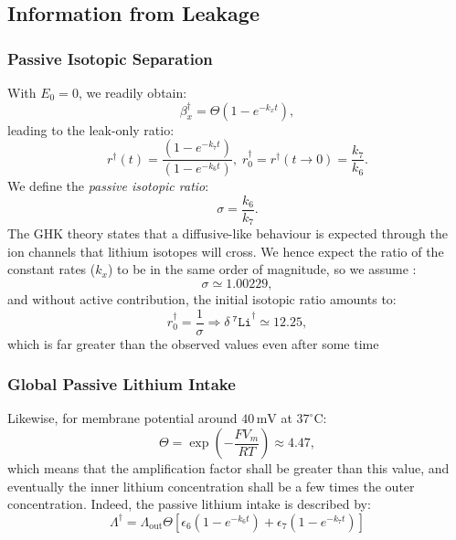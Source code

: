 \documentclass[aps,onecolumn,11pt]{revtex4}
\newcommand{\mychem}[1]{\mathtt{#1}}
\newcommand{\spLi}[1]{{~^{\mychem{#1}}\mychem{Li}}}
\newcommand{\deltaLi}{ {\delta\!\!\!\spLi{7}} }
\newcommand{\LiAll}{\Lambda}
\newcommand{\LiAllOut}{{\LiAll}_{\mathrm{out}}}
\newcommand{\todo}[1]{\framebox{\textbf{\color{WildStrawberry}{#1}}}}
\newcommand{\ko}{\dagger}
\begin{document}
\subsection{Information from Leakage}

\subsubsection{Passive Isotopic Separation}
With $E_0=0$, we readily obtain:
\begin{equation}
	\beta^\ko_x = \Theta \left(1-e^{-k_xt} \right),
\end{equation}
leading to the leak-only ratio:
\begin{equation}
	r^\ko(t) =  \dfrac{\left(1-e^{-k_7t} \right)}{\left(1-e^{-k_6t} \right)},\;r^\ko_0 = r^\ko(t\to0) = \dfrac{k_7}{k_6}.
\end{equation}
We define the \textit{passive isotopic ratio}:
\begin{equation}
\label{eq:sigma}
	\sigma  =  \dfrac{k_6}{k_7}.
\end{equation}
The GHK theory states that a diffusive-like behaviour is expected through the ion channels that lithium isotopes will cross.
We hence expect the ratio of the constant rates ($k_x$) to be in the same order of magnitude, so we assume \todo{ref}:
\begin{equation}
	\sigma \simeq 1.00229,
\end{equation}
and without active contribution, the initial isotopic ratio amounts to:
\begin{equation}
	r_0^\ko = \dfrac{1}{\sigma} \Rightarrow \deltaLi^\ko \simeq  12.25,
\end{equation}
which is far greater than the observed values even after some time \todo{ref figures in manuscript+values}


\subsubsection{Global Passive Lithium Intake}
Likewise, for membrane potential around $40\,\text{mV}$ at $37^\circ\text{C}$:
\begin{equation}
\label{eq:ThetaValue}
	\Theta = \exp\left( -\dfrac{FV_m}{RT}\right) \approx 4.47,
\end{equation}
which means that the amplification factor shall be greater than this value, and eventually the inner lithium concentration shall
be a few times the outer concentration. Indeed, the passive lithium intake is described by:
\begin{equation}
\label{eq:LiAllKO}
	\LiAll^\ko = \LiAllOut \Theta \left[ \epsilon_6 \left(1-e^{-k_6t}\right)  + \epsilon_7 \left(1-e^{-k_7t}\right)\right]
\end{equation}
\end{document}
